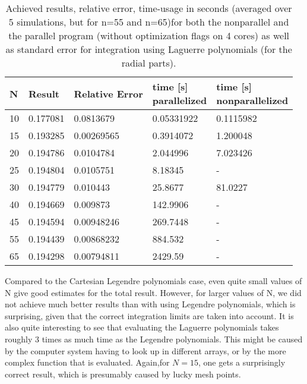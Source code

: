 \documentclass[10pt,a4paper]{article}
\begin{document}
\begin{table}[H]
\caption[Spherical Quadrature using Laguerre polynomials]{Achieved results, relative error, time-usage in seconds (averaged over 5 simulations, but for n=55 and n=65)for both the nonparallel and the parallel program (without optimization flags on 4 cores) as well as standard error for integration using Laguerre polynomials (for the radial parts).}
\begin{tabular}{|l|l|l|l|l|}
\hline
N         & Result   & Relative Error & \pbox{10cm}{time {[}s{]}\\ parallelized}  &  \pbox{10cm}{time {[}s{]}\\ nonparallelized} \\ \hline
10 & 0.177081 & 0.0813679      & 0.05331922                              & 0.1115982 \\ \hline
15 & 0.193285 & 0.00269565     & 0.3914072                               & 1.200048  \\ \hline
20 & 0.194786 & 0.0104784      & 2.044996                                & 7.023426  \\ \hline
25 & 0.194804 & 0.0105751      & 8.18345                                 & -       \\ \hline
30 & 0.194779 & 0.010443       & 25.8677                                 & 81.0227   \\ \hline
40 & 0.194669 & 0.009873       & 142.9906                                & -       \\ \hline
45 & 0.194594 & 0.00948246     & 269.7448                                & -       \\ \hline
55 & 0.194439 & 0.00868232     & 884.532                                 & -       \\ \hline
65 & 0.194298 & 0.00794811     & 2429.59                                 & -       \\ \hline
\end{tabular}
\end{table}

Compared to the Cartesian Legendre polynomials case, even quite small values of N give good estimates for the total result. However, for larger values of N, we did not achieve much better results than with using Legendre polynomials, which is surprising, given that the correct integration limits are taken into account. It is also quite interesting to see that evaluating the Laguerre polynomials takes roughly 3 times as much time as the Legendre polynomials. This might be caused by the computer system having to look up in different arrays, or by the more complex function that is evaluated. Again,for $N=15$, one gets a surprisingly correct result, which is presumably caused by lucky mesh points.
\end{document}
